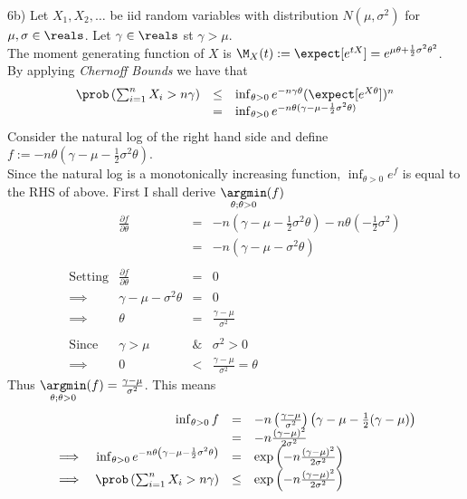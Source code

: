 \documentclass[11pt,a4paper]{article}
\begin{document}
\begin{answer}{6b)}
  Let $X_1,X_2,\dots$ be iid random variables with distribution $N(\mu,\sigma^2)$ for $\mu,\sigma\in\reals$. Let $\gamma\in\reals$ st $\gamma>\mu$.\\
  The moment generating function of $X$ is $\M_X(t):=\expect[e^{tX}]=e^{\mu\theta+\frac12\sigma^2\theta^2}$.\\
  By applying \textit{Chernoff Bounds} we have that
  \[\begin{array}{rcl}
  \prob\left(\sum_{i=1}^nX_i>n\gamma\right)&\leq&\inf_{\theta>0}e^{-n\gamma\theta}(\expect[e^{X\theta}])^n\\
  &=&\inf_{\theta>0}e^{-n\theta(\gamma-\mu-\frac12\sigma^2\theta)}
  \end{array}\]
  Consider the natural log of the right hand side and define $f:=-n\theta(\gamma-\mu-\frac12\sigma^2\theta)$.\\
  Since the natural log is a monotonically increasing function, $\inf_{\theta>0}e^f$ is equal to the RHS of above.
  First I shall derive $\underset{\theta;\theta>0}\argmin (f)$
  \[\begin{array}{rrcl}
    &\frac{\partial f}{\partial\theta}&=&-n(\gamma-\mu-\frac12\sigma^2\theta)-n\theta(-\frac12\sigma^2)\\
    &&=&-n(\gamma-\mu-\sigma^2\theta)\\\\
    \text{Setting}&\frac{\partial f}{\partial\theta}&=&0\\
    \implies&\gamma-\mu-\sigma^2\theta&=&0\\
    \implies&\theta&=&\frac{\gamma-\mu}{\sigma^2}\\\\
    \text{Since}&\gamma>\mu&\&&\sigma^2>0\\
    \implies&0&<&\frac{\gamma-\mu}{\sigma^2}=\theta
  \end{array}\]
  Thus $\underset{\theta;\theta>0}\argmin(f)=\frac{\gamma-\mu}{\sigma^2}$. This means
  \[\begin{array}{rrcl}
    &\inf_{\theta>0}f&=&-n\left(\frac{\gamma-\mu}{\sigma^2}\right)\left(\gamma-\mu-\frac12(\gamma-\mu)\right)\\
    &&=&-n\frac{(\gamma-\mu)^2}{2\sigma^2}\\
    \implies&\inf_{\theta>0}e^{-n\theta\left(\gamma-\mu-\frac12\sigma^2\theta\right)}&=&\exp\left(-n\frac{(\gamma-\mu)^2}{2\sigma^2}\right)\\
    \implies&\prob\left(\sum_{i=1}^nX_i>n\gamma\right)&\leq&\exp\left(-n\frac{(\gamma-\mu)^2}{2\sigma^2}\right)
  \end{array}\]
\end{answer}
\end{document}

